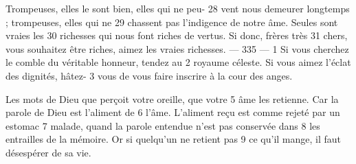 Trompeuses, elles le sont bien, elles qui ne peu-	 
28	 	vent nous demeurer longtemps ; trompeuses, elles qui ne	 
29	 	chassent pas l'indigence de notre âme. Seules sont vraies les	 
30	 	richesses qui nous font riches de vertus. Si donc, frères très	 
31	 	chers, vous souhaitez être riches, aimez les vraies richesses.	 
 	--- 335 ---	 
1	 	Si vous cherchez le comble du véritable honneur, tendez au	 
2	 	royaume céleste. Si vous aimez l'éclat des dignités, hâtez-	 
3	 	vous de vous faire inscrire à la cour des anges.

Les mots de Dieu que perçoit votre oreille, que votre	 
5	 	âme les retienne. Car la parole de Dieu est l'aliment de	 
6	 	l'âme. L'aliment reçu est comme rejeté par un estomac	 
7	 	malade, quand la parole entendue n'est pas conservée dans	 
8	 	les entrailles de la mémoire. Or si quelqu'un ne retient pas	 
9	 	ce qu'il mange, il faut désespérer de sa vie.